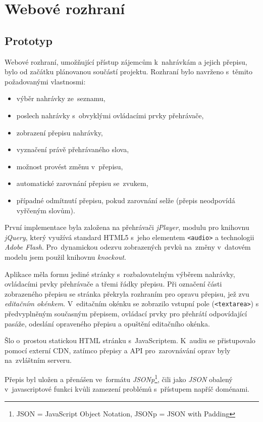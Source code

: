\chapter{Webové rozhraní}
\label{kap:webove-rozhrani}

\section{Prototyp}

Webové rozhraní, umožňující přístup zájemcům k~nahrávkám a jejich přepisu, bylo
od začátku plánovanou součástí projektu. Rozhraní bylo navrženo s~těmito
požadovanými vlastnosmi:

\begin{itemize}
\item{výběr nahrávky ze~seznamu,}
\item{poslech nahrávky s~obvyklými ovládacími prvky přehrávače,}
\item{zobrazení přepisu nahrávky,}
\item{vyznačení právě přehrávaného slova,}
\item{možnost provést změnu v~přepisu,}
\item{automatické zarovnání přepisu se~zvukem,}
\item{případné odmítnutí přepisu, pokud zarovnání selže (přepis neodpovídá
vyřčeným slovům).}
\end{itemize}

První implementace byla založena na přehrávači \textit{jPlayer}, modulu pro
knihovnu \textit{jQuery}, který využívá standard HTML5 s~jeho elementem
\texttt{<audio>} a technologii \textit{Adobe Flash}. Pro~dynamickou odezvu
zobrazených prvků na~změny v~datovém modelu jsem použil knihovnu
\textit{knockout}.

Aplikace měla formu jediné stránky s~rozbalovatelným výběrem nahrávky,
ovládacími prvky přehrávače a třemi řádky přepisu. Při označení části
zobrazeného přepisu se stránka překryla rozhraním pro opravu přepisu, jež zvu
\textit{editačním okénkem}. V~editačním okénku se zobrazilo vstupní pole
(\texttt{<textarea>}) s předvyplněným současným přepisem, ovládací prvky pro
přehrátí odpovídající pasáže, odeslání opraveného přepisu a opuštění editačního
okénka.

Šlo o~prostou statickou HTML stránku s~JavaScriptem. K~audiu se přistupovalo
pomocí externí CDN, zatímco přepisy a API pro~zarovnávání oprav byly
na~zvláštním serveru.

Přepis byl uložen a přenášen ve~formátu \textit{JSONp}\footnote{JSON =
JavaScript Object Notation, JSONp = JSON with Padding}, čili jako \textit{JSON}
obalený v~javascriptové funkci kvůli zamezení problémů s~přístupem napříč
doménami.

